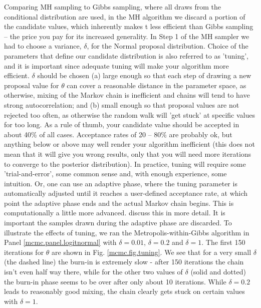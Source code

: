 Comparing MH sampling to Gibbs sampling, where all draws from the
conditional distribution are used, in the MH algorithm we discard a
portion of the candidate values, which inherently makes t less
efficient than Gibbs sampling -- the price you pay for its increased
generality.  In Step 1 of the MH sampler we had to choose a variance,
$\delta$, for the Normal proposal distribution. Choice of the
parameters that define our candidate distribution is also referred to
as 'tuning', and it is important since adequate tuning will make your
algorithm more efficient.  $\delta$ should be chosen (a) large enough
so that each step of drawing a new proposal value for $\theta$ can
cover a reasonable distance in the parameter space, as otherwise,
mixing of the Markov chain is inefficient and chains will tend to have
strong autocorrelation; and (b) small enough so that proposal values
are not rejected too often, as otherwise the random walk will 'get
stuck' at specific values for too long.  As a rule of thumb, your
candidate value should be accepted in about 40\% of all
cases. Acceptance rates of 20 -- 80\% are probably ok, but anything
below or above may well render your algorithm inefficient (this does
not mean that it will give you wrong results, only that you will need
more iterations to converge to the posterior distribution). In
practice, tuning will require some 'trial-and-error', some common
sense and, with enough experience, some intuition. Or, one can use an adaptive phase, where the tuning parameter
is automatically adjusted until it reaches a user-defined acceptance
rate, at which point the adaptive phase ends and the actual Markov
chain begins. This is computationally a little more
advanced. \citet{link_barker:2010} discuss this in more detail. It is
important the samples drawn during the adaptive phase are discarded.
To illustrate the effects of tuning, we ran the
Metropolis-within-Gibbs algorithm in Panel \ref{mcmc.panel.logitnormal} with $\delta=0.01$,
$\delta=0.2$ and $\delta=1$. The first 150 iterations for $\theta$ are
shown in Fig. \ref{mcmc.fig.tuning}. We see that for a very small
$\delta$ (the dashed line) the burn-in is extremely slow - after 150
iterations the chain isn't even half way there, while for the other
two values of $\delta$ (solid and dotted) the burn-in phase seems to be
over after only about 10 iterations. While $\delta=0.2$ leads to
reasonably good mixing, the chain clearly gets stuck on certain values
with $\delta=1$.
